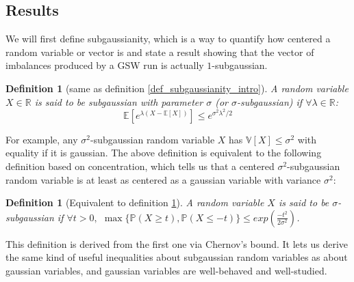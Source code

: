 \documentclass[12pt]{article}
\newtheorem{definition}[theorem]{Definition}
\begin{document}
\subsection{Results}\label{results}
We will first define subgaussianity, which is a way to quantify how centered a random variable or vector is and state a result showing that the vector of imbalances produced by a GSW run is actually $1$-subgaussian.
\begin{definition}[same as definition \ref{def_subgaussianity_intro}]\label{def_subgaussianity}
A random variable $X \in \mathbb{R}$ is said to be subgaussian with parameter $\sigma$ (or $\sigma$-subgaussian) if $\forall\lambda\in\mathbb{R}$:
$$\mathbb{E}\left[e^{\lambda(X-\mathbb{E}[X])}\right]\leq e^{\sigma^2\lambda^2/2}$$
\end{definition}
For example, any $\sigma^2$-subgaussian random variable $X$ has $\mathbb{V}[X]\leq\sigma^2$ with equality if it is gaussian. The above definition is equivalent to the following definition based on concentration, which tells us that a centered $\sigma^2$-subgaussian random variable is at least as centered as a gaussian variable with variance $\sigma^2$:
\begin{definition}[Equivalent to definition \ref{def_subgaussianity}]
A random variable $X$ is said to be $\sigma$-subgaussian if $\forall t>0,$ $\max\{\mathbb{P}(X\geq t),\mathbb{P}(X\leq -t)\}\leq exp\left(\frac{-t^2}{2\sigma^2}\right)$.
\end{definition}
This definition is derived from the first one via Chernov's bound. It lets us derive the same kind of useful inequalities about subgaussian random variables as about gaussian variables, and gaussian variables are well-behaved and well-studied. 
\end{document}
